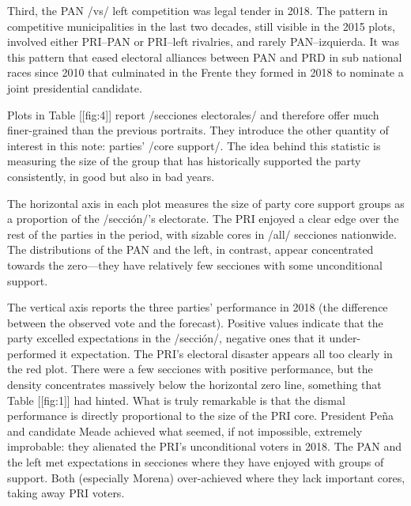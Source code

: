 \documentclass[letter,12pt]{article}
\begin{document}
Third, the PAN /vs/ left competition was legal tender in 2018. The pattern in competitive municipalities in the last two decades, still visible in the 2015 plots, involved either PRI--PAN or PRI--left rivalries, and rarely PAN--izquierda. It was this pattern that eased electoral alliances between PAN and PRD in sub national races since 2010 that culminated in the Frente they formed in 2018 to nominate a joint presidential candidate. 




Plots in Table [[fig:4]] report /secciones electorales/ and therefore offer much finer-grained than the previous portraits. They introduce the other quantity of interest in this note: parties' /core support/. The idea behind this statistic is measuring the size of the group that has historically supported the party consistently, in good but also in bad years. 


The horizontal axis in each plot measures the size of party core support groups as a proportion of the /sección/'s electorate. The PRI enjoyed a clear edge over the rest of the parties in the period, with sizable cores in /all/ secciones nationwide. The distributions of the PAN and the left, in contrast, appear concentrated towards the zero---they have relatively few secciones with some unconditional support. 

The vertical axis reports the three parties' performance in 2018 (the difference between the observed vote and the forecast). Positive values indicate that the party excelled expectations in the /sección/, negative ones that it under-performed it expectation. The PRI's electoral disaster appears all too clearly in the red plot. There were a few secciones with positive performance, but the density concentrates massively below the horizontal zero line, something that Table [[fig:1]] had hinted. What is truly remarkable is that the dismal performance is directly proportional to the size of the PRI core. President Peña and candidate Meade achieved what seemed, if not impossible, extremely improbable: they alienated the PRI's unconditional voters in 2018. The PAN and the left met expectations in secciones where they have enjoyed with groups of support. Both (especially Morena) over-achieved where they lack important cores, taking away PRI voters. 
\end{document}

